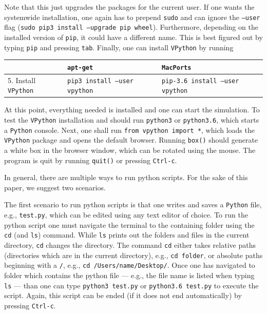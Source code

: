 \documentclass[12pt, UK english]{iopart}
\newcommand{\python}[0]{\texttt{Python}}
\newcommand{\vpython}[0]{\texttt{VPython}}
\newcommand{\code}[1]{{\scriptsize\colorbox{light-gray}{\texttt{#1}}}}
\begin{document}
Note that this just upgrades the packages for the current user.
If one wants the systemwide installation, one again has to prepend \code{sudo} and can ignore the \code{--user} flag (\code{sudo pip3 install --upgrade pip wheel}).
Furthermore, depending on the installed version of \code{pip}, it could have a different name.
This is best figured out by typing \code{pip} and pressing \texttt{tab}.
Finally, one can install \vpython{} by running
\begin{table}[h!]
\centering
\footnotesize
\begin{tabular}{l || l | l}
	& \texttt{apt-get} & \texttt{MacPorts} \\\hline
	5. Install \vpython{} & \code{pip3 install --user vpython} & \code{pip-3.6 install --user vpython} \\
\end{tabular}
\normalsize
\end{table}

At this point, everything needed is installed and one can start the simulation.
To test the \vpython{} installation and should run \code{python3} or \code{python3.6}, which starts a \python{} console.
Next, one shall run \code{from vpython import *}, which loads the \vpython{} package and opens the default browser.
Running \code{box()} should generate a white box in the browser window, which can be rotated using the mouse.
The program is quit by running \code{quit()} or pressing \texttt{Ctrl-c}.

In general, there are multiple ways to run python scripts.
For the sake of this paper, we suggest two scenarios.

The first scenario to run python scripts is that one writes and saves a \python{} file, e.g., \texttt{test.py}, which can be edited using any text editor of choice.
To run the python script one must navigate the terminal to the containing folder using the \code{cd} (and \code{ls}) command.
While \code{ls} prints out the folders and files in the current directory, \code{cd} changes the directory.
The command \code{cd} either takes relative paths (directories which are in the current directory), e.g., \code{cd folder}, or absolute paths beginning with a \code{/}, e.g., \code{cd /Users/name/Desktop/}.
Once one has navigated to folder which contains the python file --- e.g., the file name is listed when typing \code{ls} --- than one can type \code{python3 test.py} or \code{python3.6 test.py} to execute the script.
Again, this script can be ended (if it does not end automatically) by pressing \texttt{Ctrl-c}.
\end{document}

